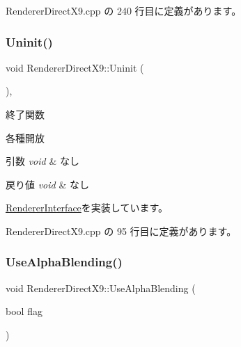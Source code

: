  Renderer\+Direct\+X9.\+cpp の 240 行目に定義があります。

\mbox{\label{class_renderer_direct_x9_af7ff314cbaa894d71e37c10565002f8f}} 
\subsubsection{\texorpdfstring{Uninit()}{Uninit()}}
{\footnotesize\ttfamily void Renderer\+Direct\+X9\+::\+Uninit (\begin{DoxyParamCaption}{ }\end{DoxyParamCaption})\hspace{0.3cm}{\ttfamily [override]}, {\ttfamily [virtual]}}



終了関数 

各種開放 
\begin{DoxyParams}{引数}
{\em void} & なし \\
\hline
\end{DoxyParams}

\begin{DoxyRetVals}{戻り値}
{\em void} & なし \\
\hline
\end{DoxyRetVals}


\mbox{\hyperlink{class_renderer_interface_ada105489f9db98e7e9542b278699d558}{Renderer\+Interface}}を実装しています。



 Renderer\+Direct\+X9.\+cpp の 95 行目に定義があります。

\mbox{\label{class_renderer_direct_x9_aa555dda63bdc0f4dfc28ac506d6e8d60}} 
\subsubsection{\texorpdfstring{Use\+Alpha\+Blending()}{UseAlphaBlending()}}
{\footnotesize\ttfamily void Renderer\+Direct\+X9\+::\+Use\+Alpha\+Blending (\begin{DoxyParamCaption}\item[{bool}]{flag }\end{DoxyParamCaption})}



